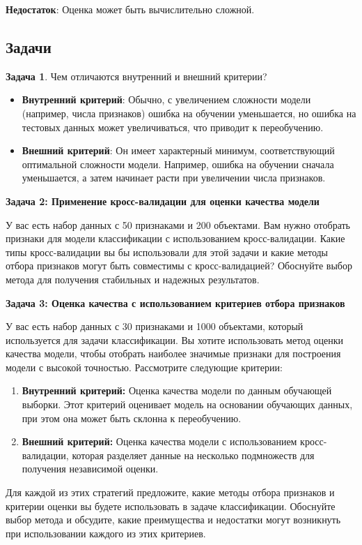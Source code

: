 \textbf{Недостаток}: Оценка может быть вычислительно сложной.
\subsection{Задачи}
\textbf{Задача 1}.
Чем отличаются внутренний и внешний критерии?
\begin{itemize}
    \item \textbf{Внутренний критерий}: Обычно, с увеличением сложности модели (например, числа признаков) ошибка на обучении уменьшается, но ошибка на тестовых данных может увеличиваться, что приводит к переобучению.
    \item \textbf{Внешний критерий}: Он имеет характерный минимум, соответствующий оптимальной сложности модели. Например, ошибка на обучении сначала уменьшается, а затем начинает расти при увеличении числа признаков.
\end{itemize}

\textbf{Задача 2: Применение кросс-валидации для оценки качества модели}

У вас есть набор данных с 50 признаками и 200 объектами. Вам нужно отобрать признаки для модели классификации с использованием кросс-валидации. Какие типы кросс-валидации вы бы использовали для этой задачи и какие методы отбора признаков могут быть совместимы с кросс-валидацией? Обоснуйте выбор метода для получения стабильных и надежных результатов.

\textbf{Задача 3: Оценка качества с использованием критериев отбора признаков}

У вас есть набор данных с 30 признаками и 1000 объектами, который используется для задачи классификации. Вы хотите использовать метод оценки качества модели, чтобы отобрать наиболее значимые признаки для построения модели с высокой точностью. Рассмотрите следующие критерии:

\begin{enumerate}
    \item \textbf{Внутренний критерий:} Оценка качества модели по данным обучающей выборки. Этот критерий оценивает модель на основании обучающих данных, при этом она может быть склонна к переобучению.
    \item \textbf{Внешний критерий:} Оценка качества модели с использованием кросс-валидации, которая разделяет данные на несколько подмножеств для получения независимой оценки.
\end{enumerate}

Для каждой из этих стратегий предложите, какие методы отбора признаков и критерии оценки вы будете использовать в задаче классификации. Обоснуйте выбор метода и обсудите, какие преимущества и недостатки могут возникнуть при использовании каждого из этих критериев.


